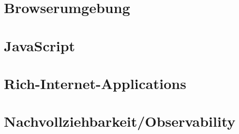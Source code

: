 \section{Browserumgebung}
\label{sec:browserumgebung}


\section{JavaScript}
\label{sec:javascript}


\section{Rich-Internet-Applications}
\label{sec:rich-internet-applications}


\section{Nachvollziehbarkeit/Observability}
\label{sec:nachvollziehbarkeit}
